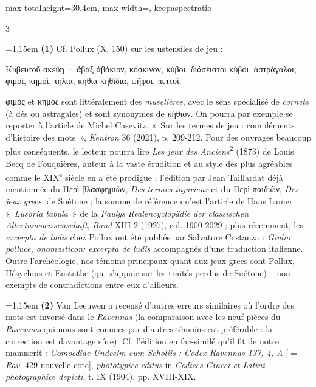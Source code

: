 \documentclass[11pt,twoside]{book}
\newcommand{\italique}[1]{\textit{#1}}
\newcommand{\citComm}[1]{\begin{quoting}[vskip=0.4pt,leftmargin=0.7em,rightmargin=0.2em]#1\end{quoting}}
\newcommand{\nieme}[1]{#1\textsuperscript{e}}
\newcommand{\expo}[1]{\textsuperscript{#1}}
\newcommand{\latin}[1]{\textit{#1}}
\newcommand{\allemand}[1]{\textit{#1}}
\begin{document}
\begin{adjustbox}{max totalheight=30.4cm, max width=\textwidth, keepaspectratio}
\begin{minipage}{\textwidth}
{\begin{multicols}{3}
\par\vspace{1.5pt}
\par\vspace{1.2pt}\par\nopagebreak\vspace{1pt}\noindent\hangindent=1.15em {\color{sepiaNote}\textbf{(1)}} Cf. Pollux (X, 150) sur les ustensiles de jeu :
\citComm{Κυβευτοῦ σκεύη · ἄβαξ ἀβάκιον, κόσκινον, κύβοι, διάσειστοι κύβοι, ἀστράγαλοι, φιμοί, κημοί, τηλία, κήθια κηθίδια, ψῆφοι, πεττοί.}
\par\vspace{1.5pt}
\noindent φιμός et κημός sont littéralement des \italique{muselières}, avec le sens spécialisé de \italique{cornets} (à dés ou astragales) et sont synonymes de κήθιον. On pourra par exemple se reporter à l'article de Michel Casevitz, «~Sur les termes de jeu : compléments d'histoire des mots~», \italique{Kentron} 36 (2021), p. 209-212. Pour des ouvrages beaucoup plus conséquents, le lecteur pourra lire \italique{Les jeux des Anciens}\expo{2} (1873) de Louis Becq de Fouquières, auteur à la vaste érudition et au style des plus agréables comme le \nieme{XIX} siècle en a été prodigue ; l'édition par Jean Taillardat déjà mentionnée du Περὶ βλασφημιῶν, \italique{Des termes injurieux} et du Περὶ παιδιῶν, \italique{Des jeux grecs}, de Suétone ; la somme de référence qu'est l'article de Hans Lamer «~\latin{Lusoria tabula}~» de la \italique{Paulys Realencyclopädie der classischen Altertumswissenschaft}, \allemand{Band} XIII 2 (1927), col. 1900-2029 ; plus récemment, les \latin{excerpta de ludis} chez Pollux ont été publiés par Salvatore Costanza : \italique{Giulio polluce, onomasticon: excerpta de ludis} accompagnés d'une traduction italienne. Outre l'archéologie, nos témoins principaux quant aux jeux grecs sont Pollux, Hésychius et Eustathe (qui s'appuie sur les traités perdus de Suétone) -- non exempts de contradictions entre eux d'ailleurs.
\par\vspace{1.5pt}
\noindent\hangindent=1.15em {\color{sepiaNote}\textbf{(2)}} Van Leeuwen a recensé d'autres erreurs similaires où l'ordre des mots est inversé dans le \italique{Ravennas} (la comparaison avec les neuf pièces du \italique{Ravennas} qui nous sont connues par d'autres témoins est préférable : la correction est davantage sûre). Cf. l'édition en fac-similé qu'il fit de notre manuscrit : \italique{Comoediae Undecim cum Scholiis : Codex Ravennas 137, 4, A} [$=$ \italique{Rav.} 429 nouvelle cote], \italique{phototypice editus} in \italique{Codices Graeci et Latini photographice depicti}, t. IX (1904), pp. XVIII-XIX.

\end{multicols}}
\end{minipage}
\end{adjustbox}
\end{document}

